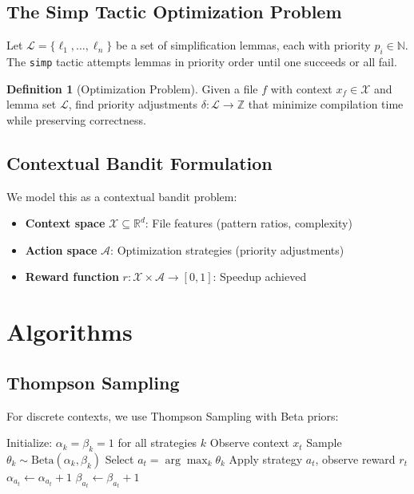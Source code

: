 \documentclass{article}
\theoremstyle{plain}
\theoremstyle{definition}
\newtheorem{definition}[theorem]{Definition}
\begin{document}
\subsection{The Simp Tactic Optimization Problem}

Let $\mathcal{L} = \{\ell_1, \ldots, \ell_n\}$ be a set of simplification lemmas, each with priority $p_i \in \mathbb{N}$. The \texttt{simp} tactic attempts lemmas in priority order until one succeeds or all fail.

\begin{definition}[Optimization Problem]
Given a file $f$ with context $x_f \in \mathcal{X}$ and lemma set $\mathcal{L}$, find priority adjustments $\delta: \mathcal{L} \rightarrow \mathbb{Z}$ that minimize compilation time while preserving correctness.
\end{definition}

\subsection{Contextual Bandit Formulation}

We model this as a contextual bandit problem:
\begin{itemize}
\item \textbf{Context space} $\mathcal{X} \subseteq \mathbb{R}^d$: File features (pattern ratios, complexity)
\item \textbf{Action space} $\mathcal{A}$: Optimization strategies (priority adjustments)
\item \textbf{Reward function} $r: \mathcal{X} \times \mathcal{A} \rightarrow [0, 1]$: Speedup achieved
\end{itemize}

\section{Algorithms}

\subsection{Thompson Sampling}

For discrete contexts, we use Thompson Sampling with Beta priors:

\begin{algorithm}
\caption{Thompson Sampling for Optimization}
\begin{algorithmic}
\STATE Initialize: $\alpha_k = \beta_k = 1$ for all strategies $k$
    \STATE Observe context $x_t$
        \STATE Sample $\theta_k \sim \text{Beta}(\alpha_k, \beta_k)$
    \ENDFOR
    \STATE Select $a_t = \arg\max_k \theta_k$
    \STATE Apply strategy $a_t$, observe reward $r_t$
        \STATE $\alpha_{a_t} \leftarrow \alpha_{a_t} + 1$
    \ELSE
        \STATE $\beta_{a_t} \leftarrow \beta_{a_t} + 1$
    \ENDIF
\ENDFOR
\end{algorithmic}
\end{algorithm}
\end{document}
